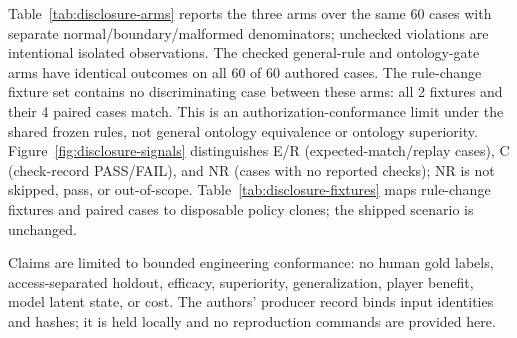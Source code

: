 Table~\ref{tab:disclosure-arms} reports the three arms over the same 60 cases with separate normal/boundary/malformed denominators; unchecked violations are intentional isolated observations. The checked general-rule and ontology-gate arms have identical outcomes on all 60 of 60 authored cases. The rule-change fixture set contains no discriminating case between these arms: all 2 fixtures and their 4 paired cases match. This is an authorization-conformance limit under the shared frozen rules, not general ontology equivalence or ontology superiority. Figure~\ref{fig:disclosure-signals} distinguishes E/R (expected-match/replay cases), C (check-record PASS/FAIL), and NR (cases with no reported checks); NR is not skipped, pass, or out-of-scope. Table~\ref{tab:disclosure-fixtures} maps rule-change fixtures and paired cases to disposable policy clones; the shipped scenario is unchanged.

Claims are limited to bounded engineering conformance: no human gold labels, access-separated holdout, efficacy, superiority, generalization, player benefit, model latent state, or cost. The authors' producer record binds input identities and hashes; it is held locally and no reproduction commands are provided here.

